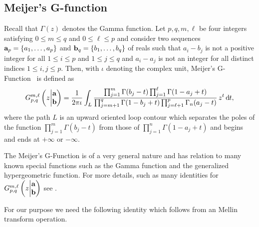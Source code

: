\begin{appendices}

\section{Meijer's G-function}\label{sec:Meijer_G_functions}

Recall that $\Gamma(z)$ denotes the Gamma function. Let $p, q, m, \ell$ be four integers satisfying $0 \le m \le q$ and $0 \le \ell \le p$ and consider two sequences ${\bf a}_p = \{a_1, \dots, a_p\}$ and ${\bf b}_q = \{b_1, \dots, b_q\}$ of reals such that $a_i - b_j$ is not a positive integer for all $1 \le i \le p$ and $1 \le j \le q$ and $a_i - a_j$ is not an integer for all distinct indices $1 \le i, j \le p$. Then, with $\iota$ denoting the complex unit, Meijer's G-Function~\cite{meijer1946gfunction} is defined as
\begin{equation}\label{eq:def_Meijer_G_function}
	\MeijerGnew{m}{\ell}{p}{q}{{\bf a}}{{\bf b}}{z} 
	= \frac{1}{2 \pi \iota} \int_L 
	\frac{\prod_{j = 1}^{m}\Gamma(b_j - t) \prod_{j = 1}^\ell \Gamma(1 - a_j + t)}
	{\prod_{j = m + 1}^{q}\Gamma(1 - b_j + t) \prod_{j = \ell + 1}^p\Gamma_n(a_j-t)} \, z^t \dd t,
\end{equation}
where the path $L$ is an upward oriented loop contour which separates the poles of the function $\prod_{j = 1}^{m}\Gamma(b_j - t)$ from those of $\prod_{j = 1}^n \Gamma(1 - a_j + t)$ and begins and ends at $+\infty$ or $-\infty$.

The Meijer's G-Function is of a very general nature and has relation to many known special functions such as the Gamma function and the generalized hypergeometric function. For more details, such as many identities for $\MeijerGnew{m}{\ell}{p}{q}{{\bf a}}{{\bf b}}{z}$ see \cite{gradshteyn2015table,luke2014mathematical}.

For our purpose we need the following identity which follows from an Mellin transform operation.


\end{appendices}
